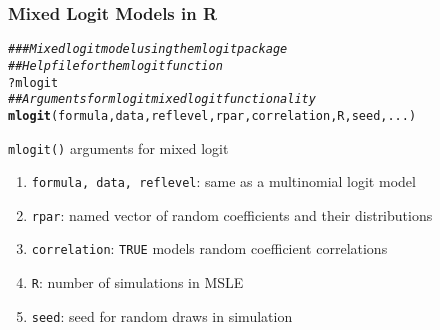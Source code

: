 \documentclass{beamer}\usepackage[]{graphicx}\usepackage[]{color}
\makeatletter
\newcommand{\hlnum}[1]{\textcolor[rgb]{0.686,0.059,0.569}{#1}}%
\newcommand{\hlstr}[1]{\textcolor[rgb]{0.192,0.494,0.8}{#1}}%
\newcommand{\hlcom}[1]{\textcolor[rgb]{0.678,0.584,0.686}{\textit{#1}}}%
\newcommand{\hlopt}[1]{\textcolor[rgb]{0,0,0}{#1}}%
\newcommand{\hlstd}[1]{\textcolor[rgb]{0.345,0.345,0.345}{#1}}%
\newcommand{\hlkwb}[1]{\textcolor[rgb]{0.69,0.353,0.396}{#1}}%
\newcommand{\hlkwc}[1]{\textcolor[rgb]{0.333,0.667,0.333}{#1}}%
\newcommand{\hlkwd}[1]{\textcolor[rgb]{0.737,0.353,0.396}{\textbf{#1}}}%
\newenvironment{kframe}{%
 \def\at@end@of@kframe{}%
 \ifinner\ifhmode%
  \def\at@end@of@kframe{\end{minipage}}%
  \begin{minipage}{\columnwidth}%
 \fi\fi%
 \def\FrameCommand##1{\hskip\@totalleftmargin \hskip-\fboxsep
 \colorbox{shadecolor}{##1}\hskip-\fboxsep
     \hskip-\linewidth \hskip-\@totalleftmargin \hskip\columnwidth}%
 \MakeFramed {\advance\hsize-\width
   \@totalleftmargin\z@ \linewidth\hsize
   \@setminipage}}%
 {\par\unskip\endMakeFramed%
 \at@end@of@kframe}
\newenvironment{knitrout}{}{} %
\makeatother
\begin{document}
\begin{frame}[fragile]\frametitle{Mixed Logit Models in R}
\begin{knitrout}\footnotesize
{}\color{fgcolor}\begin{kframe}
\begin{alltt}
\hlcom{### Mixed logit model using the mlogit package}
\hlcom{## Help file for the mlogit function}
\hlopt{?}\hlstd{mlogit}
\hlcom{## Arguments for mlogit mixed logit functionality}
\hlkwd{mlogit}\hlstd{(formula, data, reflevel, rpar, correlation, R, seed, ...)}
\end{alltt}
\end{kframe}
\end{knitrout}
    \vspace{2ex}
    \texttt{mlogit()} arguments for mixed logit
    \begin{enumerate}
        \item \texttt{formula, data, reflevel}: same as a multinomial logit model
        \item \texttt{rpar}: named vector of random coefficients and their distributions
        \item \texttt{correlation}: \texttt{TRUE} models random coefficient correlations
        \item \texttt{R}: number of simulations in MSLE
        \item \texttt{seed}: seed for random draws in simulation
    \end{enumerate}
\end{frame}

\end{document}

